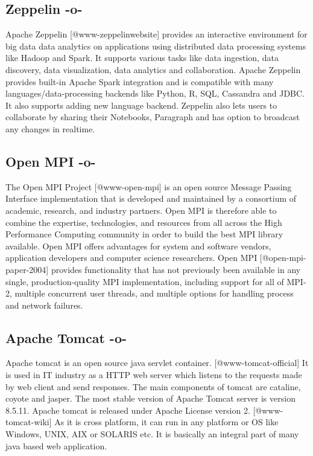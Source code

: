 \subsection{Zeppelin -o-}

Apache Zeppelin [@www-zeppelinwebsite] provides an interactive
environment for big data data analytics on applications using
distributed data processing systems like Hadoop and Spark. It supports
various tasks like data ingestion, data discovery, data visualization,
data analytics and collaboration. Apache Zeppelin provides built-in
Apache Spark integration and is compatible with many
languages/data-processing backends like Python, R, SQL, Cassandra and
JDBC. It also supports adding new language backend. Zeppelin also lets
users to collaborate by sharing their Notebooks, Paragraph and has
option to broadcast any changes in realtime.

\subsection{Open MPI -o-}

The Open MPI Project [@www-open-mpi] is an open source Message
Passing Interface implementation that is developed and maintained by a
consortium of academic, research, and industry partners. Open MPI is
therefore able to combine the expertise, technologies, and resources
from all across the High Performance Computing community in order to
build the best MPI library available. Open MPI offers advantages for
system and software vendors, application developers and computer
science researchers. Open MPI [@open-mpi-paper-2004] provides
functionality that has not previously been available in any single,
production-quality MPI implementation, including support for all of
MPI-2, multiple concurrent user threads, and multiple options for
handling process and network failures.

\subsection{Apache Tomcat -o-}

Apache tomcat is an open source java servlet
container. [@www-tomcat-official] It is used in IT industry as a
HTTP web server which listens to the requests made by web client and
send responses. The main components of tomcat are cataline, coyote and
jasper. The most stable version of Apache Tomcat server is version
8.5.11. Apache tomcat is released under Apache License version
2. [@www-tomcat-wiki] As it is cross platform, it can run in any
platform or OS like Windows, UNIX, AIX or SOLARIS etc. It is basically
an integral part of many java based web application.

